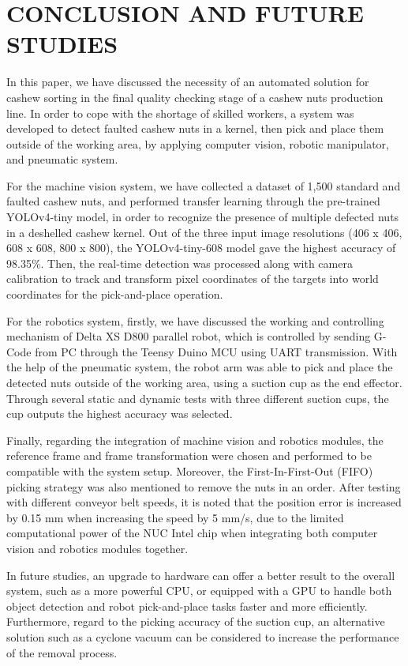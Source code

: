 \documentclass[10pt, letterpaper]{article}
\begin{document}
\section{CONCLUSION AND FUTURE STUDIES}
    In this paper, we have discussed the necessity of an automated solution for cashew sorting in the final quality checking stage of a cashew nuts production line. In order to cope with the shortage of skilled workers, a system was developed to detect faulted cashew nuts in a kernel, then pick and place them outside of the working area, by applying computer vision, robotic manipulator, and pneumatic system.\par
    For the machine vision system, we have collected a dataset of 1,500 standard and faulted cashew nuts, and performed transfer learning through the pre-trained YOLOv4-tiny model, in order to recognize the presence of multiple defected nuts in a deshelled cashew kernel. Out of the three input image resolutions (406 x 406, 608 x 608, 800 x 800), the YOLOv4-tiny-608 model gave the highest accuracy of 98.35\%. Then, the real-time detection was processed along with camera calibration to track and transform pixel coordinates of the targets into world coordinates for the pick-and-place operation.\par 
    For the robotics system, firstly, we have discussed the working and controlling mechanism of Delta XS D800 parallel robot, which is controlled by sending G-Code from PC through the Teensy Duino MCU using UART transmission. With the help of the pneumatic system, the robot arm was able to pick and place the detected nuts outside of the working area, using a suction cup as the end effector. Through several static and dynamic tests with three different suction cups, the cup outputs the highest accuracy was selected.\par
    Finally, regarding the integration of machine vision and robotics modules, the reference frame and frame transformation were chosen and performed to be compatible with the system setup. Moreover, the First-In-First-Out (FIFO) picking strategy was also mentioned to remove the nuts in an order. After testing with different conveyor belt speeds, it is noted that the position error is increased by 0.15 mm when increasing the speed by 5 mm/s, due to the limited computational power of the NUC Intel chip when integrating both computer vision and robotics modules together.\par
    In future studies, an upgrade to hardware can offer a better result to the overall system, such as a more powerful CPU, or equipped with a GPU to handle both object detection and robot pick-and-place tasks faster and more efficiently. Furthermore, regard to the picking accuracy of the suction cup, an alternative solution such as a cyclone vacuum can be considered to increase the performance of the removal process.\par
\end{document}
